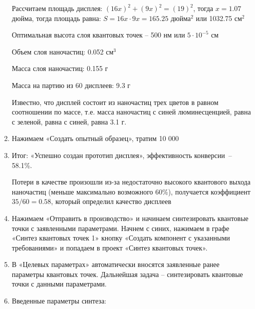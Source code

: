 \begin{enumerate}
    Рассчитаем площадь дисплея: $(16x)^2+(9x)^2 = (19)^2$, тогда $x = 1.07$ дюйма, тогда площадь равна: $S = 16x \cdot 9x = 165.25$ дюйма$^2$ или 1032.75 см$^2$
    
    Оптимальная высота слоя квантовых точек – 500 нм или $5 \cdot 10^{-5}$ см

    Объем слоя наночастиц: 0.052 см$^3$

    Масса слоя наночастиц: 0.155 г

    Масса на партию из 60 дисплеев: 9.3 г

    Известно, что дисплей состоит из наночастиц трех цветов в равном соотношении по массе, т.е. масса наночастиц с синей люминесценцией, равна с зеленой, равна с синей, равна 3.1 г.

    \item Нажимаем «Создать опытный образец», тратим 10 000 \textpeso
    \item Итог: «Успешно создан прототип дисплея», эффективность конверсии~– 58.1\%.
    
    Потери в качестве произошли из-за недостаточно высокого квантового выхода наночастиц (меньше максимально возможного 60\%), получается коэффициент $35/60 = 0.58$, который определил качество дисплеев

    \item Нажимаем «Отправить в производство» и начинаем синтезировать квантовые точки с заявленными параметрами. Начнем с синих, нажимаем в графе «Синтез квантовых точек 1» кнопку «Создать компонент с указанными требованиями» и попадаем в проект «Синтез квантовых точек».
    \item В «Целевых параметрах» автоматически вносятся заявленные ранее параметры квантовых точек. Дальнейшая задача – синтезировать квантовые точки с данными параметрами.
    \item Введенные параметры синтеза:
    

\end{enumerate}
